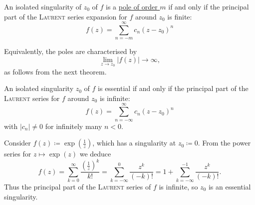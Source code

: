 \documentclass[a4paper,english]{article}
\begin{document}
\begin{cor} \label{cor:poles}
    An isolated singularity of $z_0$ of $f$ is a \hyperref[defn:pole]{pole of order $m$} if and only if the principal part of the \textsc{Laurent} series expansion for $f$ around $z_0$ is finite:
    \begin{equation*}
        f(z)
        = \sum_{n = - m}^{\infty} c_n (z - z_0)^n
    \end{equation*}
\end{cor}
Equivalently, the poles are characterised by
\begin{equation*}
    \lim_{z \to z_0} | f(z) | \to \infty,
\end{equation*}
as follows from the next theorem.

\begin{cor} \label{cor:essential}
    An isolated singularity $z_0$ of $f$ is essential if and only if the principal part of the \textsc{Laurent} series for $f$ around $z_0$ is infinite:
    \begin{equation*}
        f(z)
        = \sum_{n = - \infty}^{\infty} c_n (z - z_0)^n
    \end{equation*}
    with $| c_n | \ne 0$ for infinitely many $n < 0$.
\end{cor}

\begin{exampleB}
    Consider $f(z) \coloneqq \exp\left(\frac{1}{z}\right)$, which has a singularity at $z_0 \coloneqq 0$.
    From the power series for $z \mapsto \exp(z)$ we deduce
    \begin{equation*}
        f(z)
        = \sum_{k = 0}^{\infty} \frac{\left(\frac{1}{z}\right)^k}{k!}
        = \sum_{k = -\infty}^{0} \frac{z^k}{(- k)!}
        = 1 + \sum_{k = -\infty}^{-1} \frac{z^k}{(- k)!}.
    \end{equation*}
    Thus the principal part of the \textsc{Laurent} series of $f$ is infinite, so $z_0$ is an essential singularity.
\end{exampleB}
\end{document}
